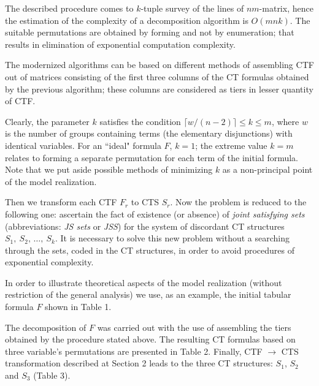 \documentclass[12pt, a4paper]{article}
\begin{document}
The described procedure comes to $k$-tuple survey of the lines of $nm$-matrix, hence the estimation of the complexity of a decomposition algorithm is $O(mnk)$. The suitable permutations are obtained by forming and not by enumeration; that results in elimination of exponential computation complexity.

The modernized algorithms can be based on different methods of assembling CTF out of matrices consisting of the first three columns of the CT formulas obtained by the previous algorithm; these columns are considered as tiers in lesser quantity of CTF.

Clearly, the parameter $k$ satisfies the condition  $\lceil w/(n-2)\rceil \le k \le m$, where  $w$  is the number of groups containing terms (the elementary disjunctions) with identical variables. For an ``ideal" formula  $F$,  $k = 1$; the extreme value $k = m$  relates to forming a separate permutation for each term of the initial formula. Note that we put aside possible methods of minimizing  $k$ as a non-principal point of the model realization.

Then we transform each CTF $F_r$ to CTS  $S_r$. Now the problem is reduced to the following one: ascertain the fact of existence (or absence) of {\it joint satisfying sets} (abbreviations: {\it JS sets} or {\it JSS}) for the system of discordant CT structures
$S_1,\ S_2,\, \dots, \ S_k$.  It is necessary to solve this new problem without a searching through the sets, coded in the CT structures, in order to avoid procedures of exponential complexity.

In order to illustrate theoretical aspects of the model realization (without restriction of the general analysis) we use, as an example, the initial tabular formula $F$ shown in Table 1.

The decomposition of $F$ was carried out with the use of assembling the tiers obtained by the procedure stated above. The resulting CT formulas based on three variable's permutations are presented in Table 2. Finally, CTF $\to$ CTS transformation described at Section 2 leads to the three CT structures:  $S_1$, $S_2$ and $S_3$ (Table 3).
\end{document}
